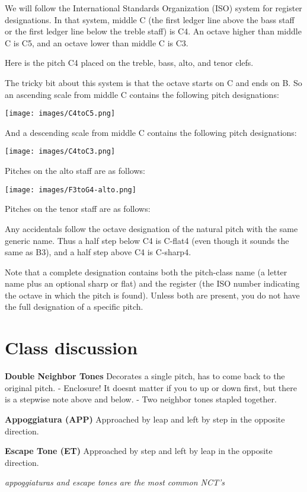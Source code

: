 \documentclass{book}
\begin{document}
We will follow the International Standards Organization (ISO) system for
register designations. In that system, middle C (the first ledger line above
the bass staff or the first ledger line below the treble staff) is C4. An
octave higher than middle C is C5, and an octave lower than middle C is C3.

Here is the pitch C4 placed on the treble, bass, alto, and tenor clefs.

The tricky bit about this system is that the octave starts on C and ends on B.
So an ascending scale from middle C contains the following pitch designations:

\texttt{[image: images/C4toC5.png]}

And a descending scale from middle C contains the following pitch
designations:

\texttt{[image: images/C4toC3.png]}

Pitches on the alto staff are as follows:

\texttt{[image: images/F3toG4-alto.png]}

Pitches on the tenor staff are as follows:

Any accidentals follow the octave designation of the natural pitch with the
same generic name. Thus a half step below C4 is C-flat4 (even though it sounds
the same as B3), and a half step above C4 is C-sharp4.

Note that a complete designation contains both the pitch-class name (a letter
name plus an optional sharp or flat) and the register (the ISO number
indicating the octave in which the pitch is found). Unless both are present,
you do not have the full designation of a specific pitch.

\hypertarget{class-discussion-34}{%
\chapter{Class discussion}\label{class-discussion-34}}

\textbf{Double Neighbor Tones} Decorates a single pitch, has to come back to
the original pitch. - Enclosure! It doesnt matter if you to up or down first,
but there is a stepwise note above and below. - Two neighbor tones stapled
together.

\textbf{Appoggiatura (APP)} Approached by leap and left by step in the
opposite direction.

\textbf{Escape Tone (ET)} Approached by step and left by leap in the opposite
direction.

\emph{appoggiaturas and escape tones are the most common NCT's}
\end{document}
